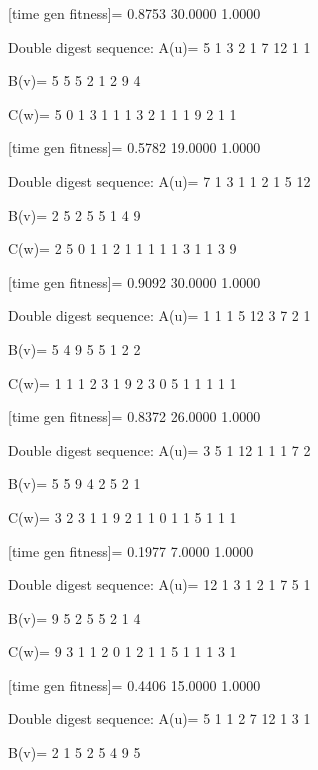 [time gen fitness]=
    0.8753   30.0000    1.0000

Double digest sequence:
A(u)=
     5     1     3     2     1     7    12     1     1

B(v)=
     5     5     5     2     1     2     9     4

C(w)=
     5     0     1     3     1     1     1     3     2     1     1     1     9     2     1     1

[time gen fitness]=
    0.5782   19.0000    1.0000

Double digest sequence:
A(u)=
     7     1     3     1     1     2     1     5    12

B(v)=
     2     5     2     5     5     1     4     9

C(w)=
     2     5     0     1     1     2     1     1     1     1     1     3     1     1     3     9

[time gen fitness]=
    0.9092   30.0000    1.0000

Double digest sequence:
A(u)=
     1     1     1     5    12     3     7     2     1

B(v)=
     5     4     9     5     5     1     2     2

C(w)=
     1     1     1     2     3     1     9     2     3     0     5     1     1     1     1     1

[time gen fitness]=
    0.8372   26.0000    1.0000

Double digest sequence:
A(u)=
     3     5     1    12     1     1     1     7     2

B(v)=
     5     5     9     4     2     5     2     1

C(w)=
     3     2     3     1     1     9     2     1     1     0     1     1     5     1     1     1

[time gen fitness]=
    0.1977    7.0000    1.0000

Double digest sequence:
A(u)=
    12     1     3     1     2     1     7     5     1

B(v)=
     9     5     2     5     5     2     1     4

C(w)=
     9     3     1     1     2     0     1     2     1     1     5     1     1     1     3     1

[time gen fitness]=
    0.4406   15.0000    1.0000

Double digest sequence:
A(u)=
     5     1     1     2     7    12     1     3     1

B(v)=
     2     1     5     2     5     4     9     5

